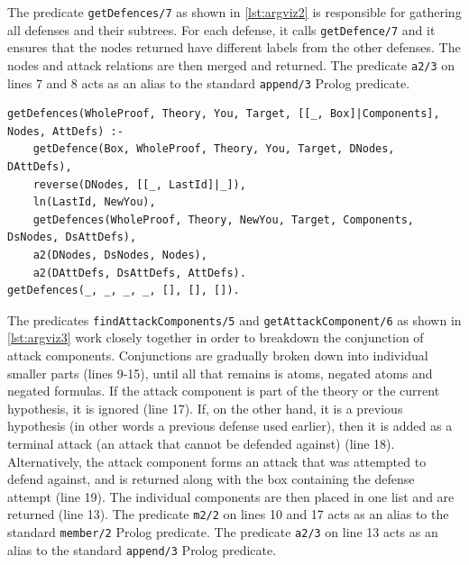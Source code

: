 \documentclass[11pt,twoside,a4paper]{report}
\begin{document}
The predicate \lstinline$getDefences/7$ as shown in \autoref{lst:argviz2} is responsible for gathering all defenses and their subtrees. For each defense, it calls \lstinline$getDefence/7$ and it ensures that the nodes returned have different labels from the other defenses. The nodes and attack relations are then merged and returned. The predicate \lstinline$a2/3$ on lines 7 and 8 acts as an alias to the standard \lstinline$append/3$ Prolog predicate.

\begin{lstlisting}[caption={Second part of the proof visualization algorithm},label=lst:argviz2]
% Gathers all defences against an attack (and their subtrees)
getDefences(WholeProof, Theory, You, Target, [[_, Box]|Components], Nodes, AttDefs) :-
	getDefence(Box, WholeProof, Theory, You, Target, DNodes, DAttDefs),
	reverse(DNodes, [[_, LastId]|_]),
	ln(LastId, NewYou),
	getDefences(WholeProof, Theory, NewYou, Target, Components, DsNodes, DsAttDefs),
	a2(DNodes, DsNodes, Nodes),
	a2(DAttDefs, DsAttDefs, AttDefs).
getDefences(_, _, _, _, [], [], []).
\end{lstlisting}

The predicates \lstinline$findAttackComponents/5$ and \lstinline$getAttackComponent/6$ as shown in \autoref{lst:argviz3} work closely together in order to breakdown the conjunction of attack components. Conjunctions are gradually broken down into individual smaller parts (lines 9-15), until all that remains is atoms, negated atoms and negated formulas. If the attack component is part of the theory or the current hypothesis, it is ignored (line 17). If, on the other hand, it is a previous hypothesis (in other words a previous defense used earlier), then it is added as a terminal attack (an attack that cannot be defended against) (line 18). Alternatively, the attack component forms an attack that was attempted to defend against, and is returned along with the box containing the defense attempt (line 19). The individual components are then placed in one list and are returned (line 13). The predicate \lstinline$m2/2$ on lines 10 and 17 acts as an alias to the standard \lstinline$member/2$ Prolog predicate. The predicate \lstinline$a2/3$ on line 13 acts as an alias to the standard \lstinline$append/3$ Prolog predicate.
\end{document}
